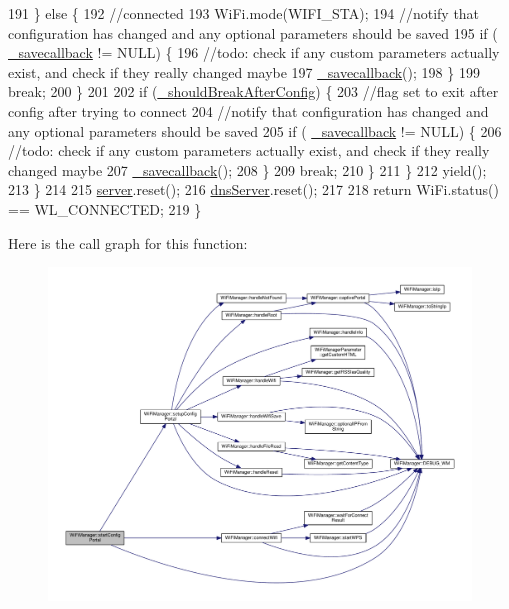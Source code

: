\begin{DoxyCode}
191       \} \textcolor{keywordflow}{else} \{
192         \textcolor{comment}{//connected}
193         WiFi.mode(WIFI\_STA);
194         \textcolor{comment}{//notify that configuration has changed and any optional parameters should be saved}
195         \textcolor{keywordflow}{if} ( \hyperlink{class_wi_fi_manager_a9a316060184788e33e71d88101cb2e0d}{\_savecallback} != NULL) \{
196           \textcolor{comment}{//todo: check if any custom parameters actually exist, and check if they really changed maybe}
197           \hyperlink{class_wi_fi_manager_a9a316060184788e33e71d88101cb2e0d}{\_savecallback}();
198         \}
199         \textcolor{keywordflow}{break};
200       \}
201 
202       \textcolor{keywordflow}{if} (\hyperlink{class_wi_fi_manager_adf42bd3bb7ac538e97407f66e5170858}{\_shouldBreakAfterConfig}) \{
203         \textcolor{comment}{//flag set to exit after config after trying to connect}
204         \textcolor{comment}{//notify that configuration has changed and any optional parameters should be saved}
205         \textcolor{keywordflow}{if} ( \hyperlink{class_wi_fi_manager_a9a316060184788e33e71d88101cb2e0d}{\_savecallback} != NULL) \{
206           \textcolor{comment}{//todo: check if any custom parameters actually exist, and check if they really changed maybe}
207           \hyperlink{class_wi_fi_manager_a9a316060184788e33e71d88101cb2e0d}{\_savecallback}();
208         \}
209         \textcolor{keywordflow}{break};
210       \}
211     \}
212     yield();
213   \}
214 
215   \hyperlink{class_wi_fi_manager_a509523a01c0395cf0dc235b074f2a5ea}{server}.reset();
216   \hyperlink{class_wi_fi_manager_af44ccd00daee619a7bcc89000fa063ca}{dnsServer}.reset();
217 
218   \textcolor{keywordflow}{return}  WiFi.status() == WL\_CONNECTED;
219 \}
\end{DoxyCode}
Here is the call graph for this function\+:\nopagebreak
\begin{figure}[H]
\begin{center}
\leavevmode
\includegraphics[width=350pt]{d4/dc8/class_wi_fi_manager_afaca5021edffb4d9a5bd39f7b0f7a686_cgraph}
\end{center}
\end{figure}
